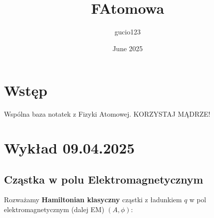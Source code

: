 \documentclass{article}
\title{FAtomowa}
\author{gucio123 }
\date{June 2025}
\begin{document}
\maketitle

\section{Wstęp}

Wspólna baza notatek z Fizyki Atomowej.
KORZYSTAJ MĄDRZE!

\section{Wykład 09.04.2025}

\subsection{Cząstka w polu Elektromagnetycznym}

Rozważamy \textbf{Hamiltonian klasyczny} cząstki z ładunkiem $q$ w pol elektromagnetycznym (dalej EM) $(A, \phi)$:
\end{document}
